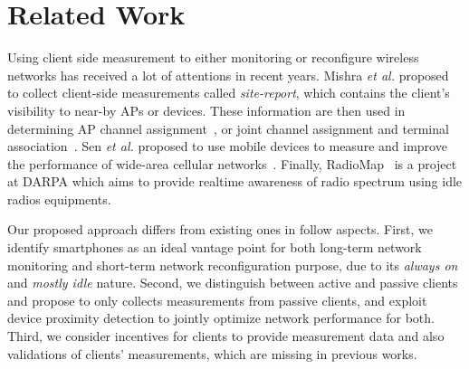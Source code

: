 \section{Related Work}
\label{sec:related}

Using client side measurement to either monitoring or reconfigure wireless
networks has received a lot of attentions in recent years. Mishra \textit{et al.}
proposed to collect client-side measurements called \textit{site-report}, which
contains the client's visibility to near-by APs or devices. These information
are then used in determining AP channel
assignment~\cite{mishra:mccr2005,dasilva:mswim2008,mishra:mobicom2006}, or joint
channel assignment and terminal association~\cite{mishra:infocom2006}. Sen
\textit{et al.} proposed to use mobile devices to measure and improve the performance of
wide-area cellular networks~\cite{sen2011can}. Finally, RadioMap~\cite{radiomap}
is a project at DARPA which aims to provide realtime awareness of radio spectrum
using idle radios equipments.

Our proposed approach differs from existing ones in follow aspects. First, we
identify smartphones as an ideal vantage point for both long-term network
monitoring and short-term network reconfiguration purpose, due to its
\textit{always on } and \textit{mostly idle} nature. Second, we distinguish
between active and passive clients and propose to only collects measurements
from passive clients, and exploit device proximity detection to jointly optimize
network performance for both.  Third, we consider incentives for clients to
provide measurement data and also validations of clients' measurements, which
are missing in previous works.
